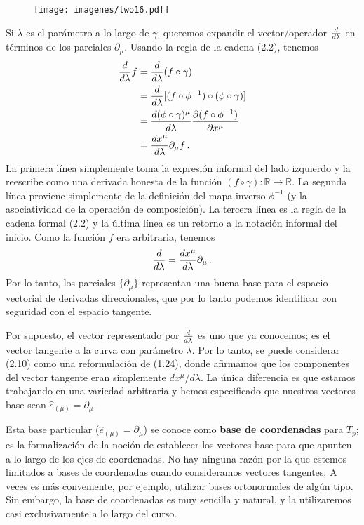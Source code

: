 \documentclass[11pt,b5paper,openany,twoside]{book}
\newcommand{\e}[1]{\hat{e}_{(#1)}}
\newcommand{\p}[1]{{\partial_{#1}}}
\newcommand{\R}{\mathbb{R}}
\begin{document}
\begin{figure}[h]
\centering
\texttt{[image: imagenes/two16.pdf]}
\end{figure}

\noindent
Si $\lambda$ es el parámetro a lo largo de $\gamma$, queremos expandir el vector/operador ${{d}\over{d\lambda}}$ en términos de los parciales $\p\mu$.
Usando la regla de la cadena (2.2), tenemos
\begin{align}
{d\over{d\lambda}}f &=  {d\over{d\lambda}}(f\circ\gamma)\nonumber \\
&=  {d\over{d\lambda}}[(f\circ\phi^{-1})\circ(\phi\circ\gamma)]\nonumber \\
&=  {{d(\phi\circ\gamma)^\mu}\over{d\lambda}}
{{\partial(f\circ\phi^{-1})}\over{\partial x^\mu}}\nonumber \\
&=  {{dx^\mu}\over{d\lambda}}\p\mu f\,. \label{2.9}
\end{align}
La primera línea simplemente toma la expresión informal del lado izquierdo y la reescribe como una derivada honesta de la función $(f\circ\gamma):\R\rightarrow\R$.
La segunda línea proviene simplemente de la definición del mapa inverso $\phi^{-1}$ (y la asociatividad de la operación de composición).
La tercera línea es la regla de la cadena formal (2.2) y la última línea es un retorno a la notación informal del inicio.
Como la función $f$ era arbitraria, tenemos
\begin{equation}
{d\over{d\lambda}} = {{dx^\mu}\over{d\lambda}}\p\mu\,.\label{2.10}
\end{equation}
Por lo tanto, los parciales $\{\p\mu\}$ representan una buena base para el espacio vectorial de derivadas direccionales, que por lo tanto podemos identificar con seguridad con el espacio tangente.

Por supuesto, el vector representado por ${d\over{d\lambda}}$ es uno que ya conocemos; es el vector tangente a la curva con parámetro $\lambda$.
Por lo tanto, se puede considerar (2.10) como una reformulación de (1.24), donde afirmamos que los componentes del vector tangente eran simplemente $dx^\mu/d\lambda$.
La única diferencia es que estamos trabajando en una variedad arbitraria y hemos especificado que nuestros vectores base sean $\e\mu=\p\mu$.

Esta base particular ($\e\mu=\p\mu$) se conoce como {\bf base de coordenadas} para $T_p$; es la formalización de la noción de establecer los vectores base para que apunten a lo largo de los ejes de coordenadas.
No hay ninguna razón por la que estemos limitados a bases de coordenadas cuando consideramos vectores tangentes; A veces es más conveniente, por ejemplo, utilizar bases ortonormales de algún tipo.
Sin embargo, la base de coordenadas es muy sencilla y natural, y la utilizaremos casi exclusivamente a lo largo del curso.
\end{document}

